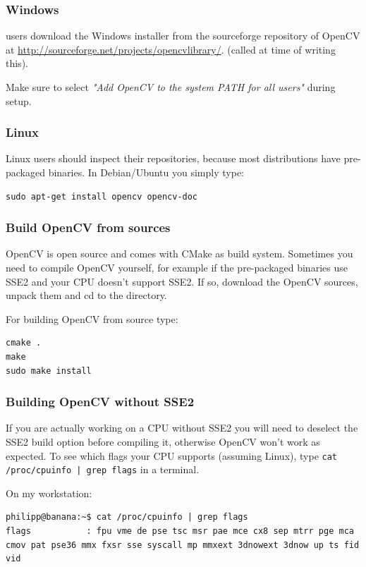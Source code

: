 \subsubsection*{Windows}
 users download the Windows installer from the sourceforge repository of OpenCV at \url{http://sourceforge.net/projects/opencvlibrary/}. (called  at time of writing this). 

Make sure to select \textit{"Add OpenCV to the system PATH for all users"} during setup.

\subsubsection*{Linux}
Linux users should inspect their repositories, because most distributions have pre-packaged binaries. In Debian/Ubuntu you simply type:
\begin{lstlisting}
sudo apt-get install opencv opencv-doc
\end{lstlisting}

\subsubsection*{Build OpenCV from sources}
OpenCV is open source and comes with CMake as build system. Sometimes you need to compile OpenCV yourself, for example if the pre-packaged binaries use SSE2 and your CPU doesn't support SSE2. If so, download the OpenCV sources, unpack them and cd to the directory.

For building OpenCV from source type:
\begin{lstlisting}
cmake .
make 
sudo make install
\end{lstlisting}

\subsubsection*{Building OpenCV without SSE2}
If you are actually working on a CPU without SSE2 you will need to deselect the SSE2 build option before compiling it, otherwise OpenCV won't work as expected. To see which flags your CPU supports (assuming Linux), type \lstinline{cat /proc/cpuinfo | grep flags} in a terminal.

On my workstation:

\begin{lstlisting}
philipp@banana:~$ cat /proc/cpuinfo | grep flags
flags           : fpu vme de pse tsc msr pae mce cx8 sep mtrr pge mca cmov pat pse36 mmx fxsr sse syscall mp mmxext 3dnowext 3dnow up ts fid vid
\end{lstlisting}

